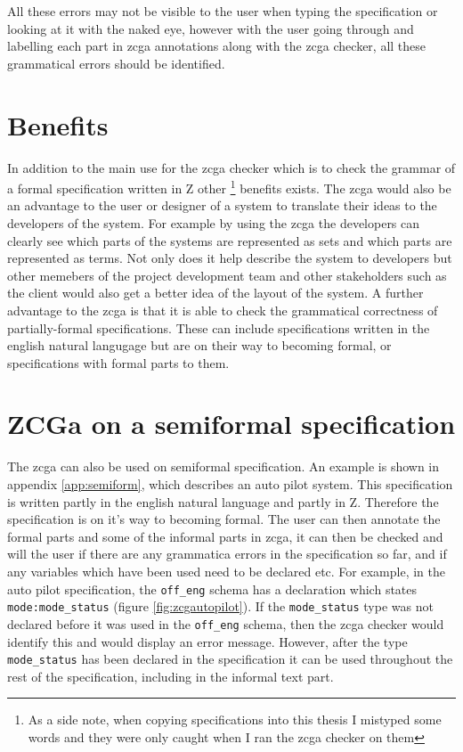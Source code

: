 All these errors may not be visible to the user when typing the specification or looking at it with the naked eye, however with the user going through and labelling each part in \gls{zcga} annotations along with the \gls{zcga} checker, all these grammatical errors should be identified.


\section{Benefits}

In addition to the main use for the \gls{zcga} checker which is to check the grammar of a formal specification written in Z other \footnote{As a side note, when copying specifications into this thesis I mistyped some words and they were only caught when I ran the \gls{zcga} checker on them} benefits exists. The \gls{zcga} would also be an advantage to the user or designer of a system to translate their ideas to the developers of the system. For example by using the \gls{zcga} the developers can clearly see which parts of the systems are represented as sets and which parts are represented as terms. Not only does it help describe the system to developers but other memebers of the project development team and other stakeholders such as the client would also get a better idea of the layout of the system.
A further advantage to the \gls{zcga} is that it is able to check the grammatical correctness of partially-formal specifications. These can include specifications written in the english natural langugage but are on their way to becoming formal, or specifications with formal parts to them.

\section{ZCGa on a semiformal specification}

The \gls{zcga} can also be used on semiformal specification. An example is shown in appendix \ref{app:semiform}, which describes an auto pilot system. This specification is written partly in the english natural language and partly in Z. Therefore the specification is on it's way to becoming formal. The user can then annotate the formal parts and some of the informal parts in \gls{zcga}, it can then be checked and will the user if there are any grammatica errors in the specification so far, and if any variables which have been used need to be declared etc. For example, in the auto pilot specification, the \verb|off_eng| schema has a declaration which states \verb|mode:mode_status| (figure \ref{fig:zcgautopilot}). If the \verb|mode_status| type was not declared before it was used in the \verb|off_eng| schema, then the \gls{zcga} checker would identify this and would display an error message. However, after the type \verb|mode_status| has been declared in the specification it can be used throughout the rest of the specification, including in the informal text part.

